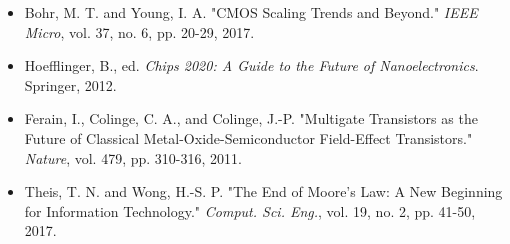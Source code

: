 \documentclass[a4paper, 11pt]{article}
\begin{document}
\begin{itemize}
\item Bohr, M. T. and Young, I. A. "CMOS Scaling Trends and Beyond." \textit{IEEE Micro}, vol. 37, no. 6, pp. 20-29, 2017.
\item Hoefflinger, B., ed. \textit{Chips 2020: A Guide to the Future of Nanoelectronics}. Springer, 2012.
\item Ferain, I., Colinge, C. A., and Colinge, J.-P. "Multigate Transistors as the Future of Classical Metal-Oxide-Semiconductor Field-Effect Transistors." \textit{Nature}, vol. 479, pp. 310-316, 2011.
\item Theis, T. N. and Wong, H.-S. P. "The End of Moore's Law: A New Beginning for Information Technology." \textit{Comput. Sci. Eng.}, vol. 19, no. 2, pp. 41-50, 2017.
\end{itemize}
\end{document}
